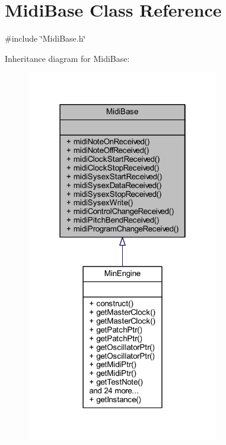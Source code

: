 \hypertarget{class_midi_base}{}\section{Midi\+Base Class Reference}
\label{class_midi_base}


{\ttfamily \#include \char`\"{}Midi\+Base.\+h\char`\"{}}



Inheritance diagram for Midi\+Base\+:
\nopagebreak
\begin{figure}[H]
\begin{center}
\leavevmode
\includegraphics[width=238pt]{d9/d89/class_midi_base__inherit__graph}
\end{center}
\end{figure}


